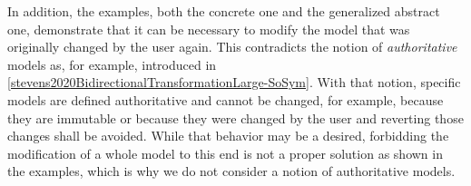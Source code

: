 In addition, the examples, both the concrete one and the generalized abstract one, demonstrate that it can be necessary to modify the model that was originally changed by the user again.
This contradicts the notion of \emph{authoritative} models as, for example, introduced in \autoref{stevens2020BidirectionalTransformationLarge-SoSym}.
With that notion, specific models are defined authoritative and cannot be changed, for example, because they are immutable or because they were changed by the user and reverting those changes shall be avoided.
While that behavior may be a desired, forbidding the modification of a whole model to this end is not a proper solution as shown in the examples, which is why we do not consider a notion of authoritative models.








